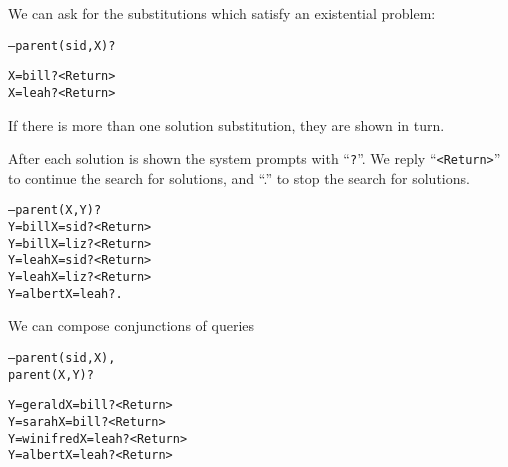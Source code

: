 \documentclass{popl}
\def\user#1{{#1}}
\def\Return{{\scriptsize\tt\user{<Return>}}}
\newenvironment{smalltt}{\begin{alltt}\smaller}{\end{alltt}}
\begin{document}
\begin{foil} 
We can ask for the substitutions which satisfy an existential problem:
\begin{smalltt}
        -- \user{parent(sid, X)?}       
        
        X = bill         ?       \Return
        X = leah         ?       \Return
\end{smalltt}

If there is more than one solution substitution, they are shown in turn.

After each solution is shown the system prompts with ``{\tt ?}''. We reply
``\user{\smaller\tt <Return>}'' to continue the search for solutions, and
``\user{.}'' to stop the search for solutions.

\begin{smalltt}
        -- \user{parent(X, Y)?}
        Y = bill     X = sid  ? \Return
        Y = bill     X = liz  ? \Return
        Y = leah     X = sid  ? \Return
        Y = leah     X = liz  ? \Return
        Y = albert   X = leah ? \user{.}
\end{smalltt}

We can compose conjunctions of queries
\begin{smalltt}
        -- \user{parent(sid, X),}       
           \user{parent(X,   Y)?}       
           
        Y = gerald   X = bill ?  \Return
        Y = sarah    X = bill ?  \Return
        Y = winifred X = leah ?  \Return
        Y = albert   X = leah ?  \Return
\end{smalltt}

        
\end{foil}
\end{document}
